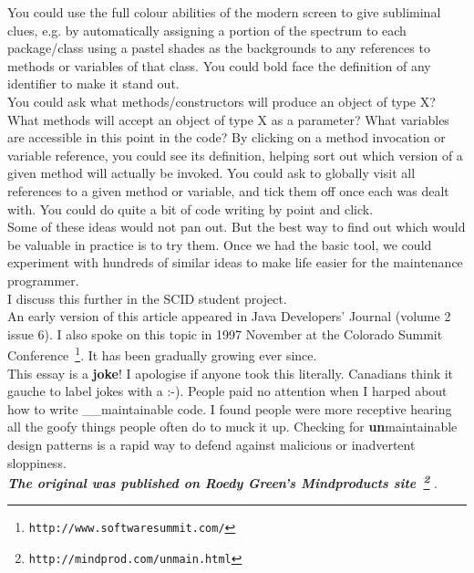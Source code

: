 \documentclass[11pt,twoside,a4paper]{article}
\begin{document}
You could use the full colour abilities of the modern screen to give subliminal clues, e.g. by automatically assigning a portion of the spectrum to each package/class using a pastel shades as the backgrounds to any references to methods or variables of that class. You could bold face the definition of any identifier to make it stand out.~\\ 

You could ask what methods/constructors will produce an object of type X? What methods will accept an object of type X as a parameter? What variables are accessible in this point in the code? By clicking on a method invocation or variable reference, you could see its definition, helping sort out which version of a given method will actually be invoked. You could ask to globally visit all references to a given method or variable, and tick them off once each was dealt with. You could do quite a bit of code writing by point and click.~\\ 

Some of these ideas would not pan out. But the best way to find out which would be valuable in practice is to try them. Once we had the basic tool, we could experiment with hundreds of similar ideas to make life easier for the maintenance programmer.~\\ 

I discuss this further in the SCID student project.~\\ 

An early version of this article appeared in Java Developers' Journal (volume 2 issue 6). I also spoke on this topic in 1997 November at the Colorado Summit Conference~\footnote{\texttt{http://www.softwaresummit.com/}}. It has been gradually growing ever since.~\\ 

This essay is a \textbf{joke}! I apologise if anyone took this literally. Canadians think it gauche to label jokes with a :-). People paid no attention when I harped about how to write \_\_maintainable code. I found people were more receptive hearing all the goofy things people often do to muck it up. Checking for \textbf{un}maintainable design patterns is a rapid way to defend against malicious or inadvertent sloppiness.~\\

\textbf{\textit{\scriptsize The original was published on Roedy Green's Mindproducts site~\footnote{\texttt{http://mindprod.com/unmain.html}} }}. 
\end{document}
